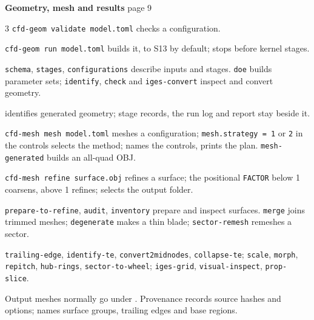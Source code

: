 \clearpage
\begin{tcolorbox}[colback=acc!8,colframe=acc,boxrule=0.4pt]
{\Large\bfseries\color{acc} Geometry, mesh and results}
\hfill \pkgname{} \textbf{\pkgversion} \quad page 9
\end{tcolorbox}
\fontsize{8}{10}\selectfont\raggedright
\begin{multicols}{3}
\texttt{cfd-geom validate model.toml} checks a configuration.\par
\texttt{cfd-geom run model.toml} builds it, to S13 by default;
 stops before kernel stages.\par
\texttt{schema}, \texttt{stages}, \texttt{configurations} describe inputs and
stages. \texttt{doe} builds parameter sets; \texttt{identify}, \texttt{check}
and \texttt{iges-convert} inspect and convert geometry.\par
{} identifies generated geometry;
stage records, the run log and report stay beside it.

\texttt{cfd-mesh mesh model.toml} meshes a configuration;
\texttt{mesh.strategy = 1} or \texttt{2} in the controls selects the method;
 names the controls,  prints the plan.
\texttt{mesh-generated} builds an all-quad OBJ.\par
\texttt{cfd-mesh refine surface.obj} refines a surface;
the positional \texttt{FACTOR} below 1 coarsens, above 1 refines;
 selects the output folder.\par
\texttt{prepare-to-refine}, \texttt{audit}, \texttt{inventory} prepare and
inspect surfaces. \texttt{merge} joins trimmed meshes;
\texttt{degenerate} makes a thin blade; \texttt{sector-remesh} remeshes a sector.

\texttt{trailing-edge}, \texttt{identify-te}, \texttt{convert2midnodes},
\texttt{collapse-te}; \texttt{scale}, \texttt{morph}, \texttt{repitch},
\texttt{hub-rings}, \texttt{sector-to-wheel}; \texttt{iges-grid},
\texttt{visual-inspect}, \texttt{prop-slice}.\par
Output meshes normally go under . Provenance records source
hashes and options;  names surface groups,
trailing edges and base regions.


\end{multicols}
